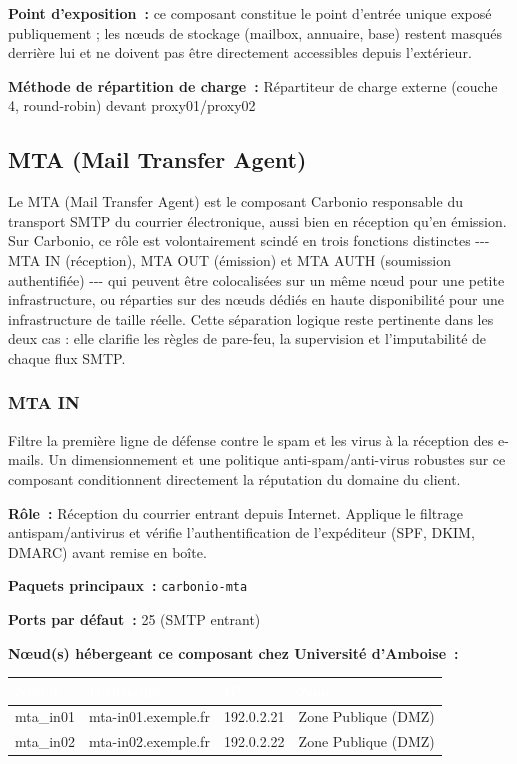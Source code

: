 \documentclass[11pt,a4paper]{report}
\newcommand{\tblhead}[1]{\textcolor{white}{\textbf{#1}}}
\begin{document}
\textbf{Point d'exposition~:} ce composant constitue le point d'entrée unique exposé publiquement ; les nœuds de stockage (mailbox, annuaire, base) restent masqués derrière lui et ne doivent pas être directement accessibles depuis l'extérieur.

\textbf{Méthode de répartition de charge~:} Répartiteur de charge externe (couche 4, round-\allowbreak{}robin) devant proxy01/proxy02


\subsection{MTA (Mail Transfer Agent)}
Le MTA (Mail Transfer Agent) est le composant Carbonio responsable du transport SMTP du courrier électronique, aussi bien en réception qu'en émission.\allowbreak{} Sur Carbonio, ce rôle est volontairement scindé en trois fonctions distinctes -\allowbreak{}-\allowbreak{}-\allowbreak{} MTA IN (réception), MTA OUT (émission) et MTA AUTH (soumission authentifiée) -\allowbreak{}-\allowbreak{}-\allowbreak{} qui peuvent être colocalisées sur un même nœud pour une petite infrastructure, ou réparties sur des nœuds dédiés en haute disponibilité pour une infrastructure de taille réelle.\allowbreak{} Cette séparation logique reste pertinente dans les deux cas : elle clarifie les règles de pare-\allowbreak{}feu, la supervision et l'imputabilité de chaque flux SMTP.\allowbreak{}

\subsubsection{MTA IN}

Filtre la première ligne de défense contre le spam et les virus à la réception des e-\allowbreak{}mails.\allowbreak{} Un dimensionnement et une politique anti-\allowbreak{}spam/anti-\allowbreak{}virus robustes sur ce composant conditionnent directement la réputation du domaine du client.\allowbreak{}

\textbf{Rôle~:} Réception du courrier entrant depuis Internet.\allowbreak{} Applique le filtrage antispam/antivirus et vérifie l'authentification de l'expéditeur (SPF, DKIM, DMARC) avant remise en boîte.\allowbreak{}


\textbf{Paquets principaux~:} \texttt{carbonio-\allowbreak{}mta}

\textbf{Ports par défaut~:} 25 (SMTP entrant)

\textbf{Nœud(s) hébergeant ce composant chez Université d'Amboise~:}
\begin{longtable}{|p{3.2cm}|p{4.5cm}|p{3.2cm}|p{2.3cm}|}
\hline
\rowcolor{primary}\tblhead{Nœud} & \tblhead{Hostname} & \tblhead{IP} & \tblhead{Zone} \\
\hline
\endhead
mta\_in01 & mta-\allowbreak{}in01.\allowbreak{}exemple.\allowbreak{}fr & 192.\allowbreak{}0.\allowbreak{}2.\allowbreak{}21 & Zone Publique (DMZ) \\
\hline
mta\_in02 & mta-\allowbreak{}in02.\allowbreak{}exemple.\allowbreak{}fr & 192.\allowbreak{}0.\allowbreak{}2.\allowbreak{}22 & Zone Publique (DMZ) \\
\hline
\end{longtable}
\end{document}
